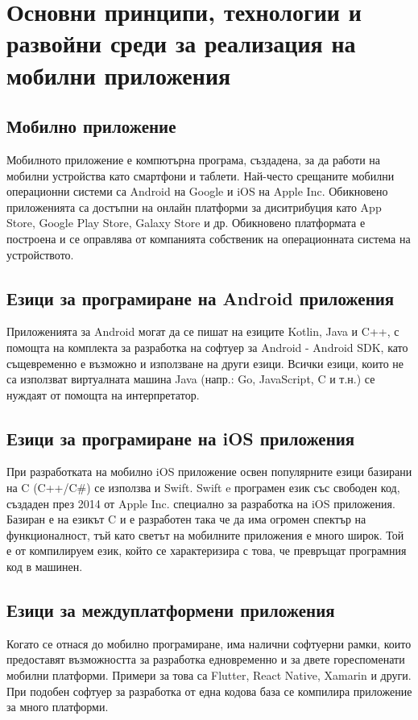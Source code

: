 \section{Основни принципи, технологии и развойни среди за реализация на мобилни приложения}
\subsection{Мобилно приложение}
Мобилното приложение е компютърна програма, създадена, за да работи на мобилни устройства като смартфони и таблети. Най-често срещаните мобилни операционни системи са Android на Google и iOS на Apple Inc. Обикновено приложенията са достъпни на онлайн платформи за диситрибуция като App Store, Google Play Store, Galaxy Store и др. Обикновено платформата е построена и се оправлява от компанията собственик на операционната система на устройството.

\subsection{Езици за програмиране на Android приложения}
Приложенията за Android могат да се пишат на езиците Kotlin, Java и C++, с помощта на комплекта за разработка на софтуер за Android - Android SDK, като същевременно е възможно и използване на други езици. Всички езици, които не са използват виртуалната машина Java (напр.: Go, JavaScript, C и т.н.) се нуждаят от помощта на интерпретатор.

\subsection{Езици за програмиране на iOS приложения}
При разработката на мобилно iOS приложение освен популярните езици базирани на C (C++/C\#) се използва и Swift. Swift e програмен език със свободен код, създаден през 2014 от Apple Inc. специално за разработка на iOS приложения. Базиран е на езикът C и е разработен така че да има огромен спектър на функционалност, тъй като светът на мобилните приложения е много широк. Той е от компилируем език, който се характеризира с това, че превръщат програмния код в машинен.

\subsection{Езици за междуплатформени приложения}
Когато се отнася до мобилно програмиране, има налични софтуерни рамки, които предоставят възможността за разработка едновременно и за двете гореспоменати мобилни платформи. Примери за това са Flutter, React Native, Xamarin и други. При подобен софтуер за разработка от една кодова база се компилира приложение за много платформи.

